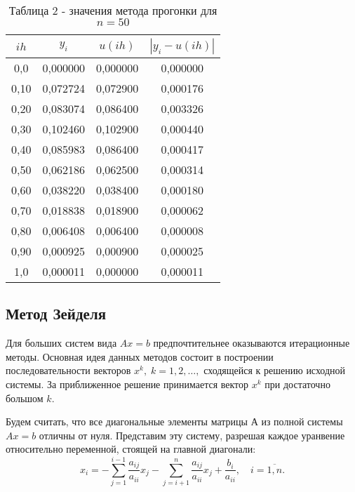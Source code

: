 \documentclass[a4paper,12pt]{article}
\begin{document}
{\begin{table}[h]
    \centering
    \begin{tabular}{|c|c|c|c|}
        \hline
        $ih$ & $y_i$ & $u(ih)$ & $\left|y_i - u(ih)\right|$\\
        \hline
        0,0 & 0,000000  & 0,000000  & 0,000000  \\           
        \hline
        0,10 & 0,072724  & 0,072900  & 0,000176  \\
        \hline
        0,20 & 0,083074  & 0,086400  & 0,003326  \\
        \hline
        0,30 & 0,102460  & 0,102900  & 0,000440  \\
        \hline
        0,40 & 0,085983  & 0,086400  & 0,000417  \\
        \hline
        0,50 & 0,062186  & 0,062500  & 0,000314  \\
        \hline
        0,60 & 0,038220  & 0,038400  & 0,000180  \\
        \hline
        0,70 & 0,018838  & 0,018900  & 0,000062  \\
        \hline
        0,80 & 0,006408  & 0,006400  & 0,000008  \\
        \hline
        0,90 & 0,000925  & 0,000900  & 0,000025  \\
        \hline
        1,0 & 0,000011  & 0,000000  & 0,000011  \\
        \hline
    \end{tabular}
    \caption*{\small{Таблица 2 - значения метода прогонки для $n = 50$}}
\end{table}
\subsection{Метод Зейделя}
\hspace*{1.25cm}Для больших систем вида $Ax=b$ предпочтительнее оказываются итерационные методы. 
Основная идея данных методов состоит в построении последовательности векторов $x^k, \; k=1,2,\dots,$ 
сходящейся к решению исходной системы. За приближенное решение принимается вектор $x^k$ при достаточно большом $k$.

Будем считать, что все диагональные элементы матрицы $А$ из полной системы $Ax=b$ отличны от нуля. 
Представим эту систему, разрешая каждое уранвение относительно переменной, стоящей на главной диагонали: 
\begin{equation}
x_i = - \sum\limits_{j=1}^{i-1} \frac{a_{ij}}{a_{ii}}x_j - \sum\limits_{j=i+1}^n \frac{a_{ij}}{a_{ii}}x_j+\frac{b_i}{a_{ii}}, \quad i = \overline{1,n}.
 \label{5}
\end{equation}

}
\end{document}

